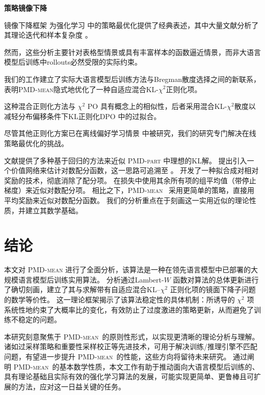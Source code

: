 \documentclass{article}
\theoremstyle{plain}
\theoremstyle{definition}
\theoremstyle{remark}
\begin{document}
\textbf{策略镜像下降}

镜像下降框架 \citep{nemirovski1983problem} 为强化学习 \citep{geist2019theory,tomarmirror} 中的策略最优化提供了经典表述，其中大量文献分析了其理论迭代和样本复杂度 \citep{xiao2022convergence,zhan2023policy,lan2023policy,yuan2023linear,alfano2023novel,xu2024sample}。

然而，这些分析主要针对表格型情景或具有丰富样本的函数逼近情景，而非大语言模型后训练中rollouts必然受限的实际约束。

我们的工作建立了实际大语言模型后训练方法与Bregman散度选择之间的新联系，表明\textsc{PMD-mean}隐式地优化了一种自适应混合KL-$\chi^2$正则化项。

这种混合正则化方法与 $\chi^2$ PO \citep{huang2024correcting} 具有概念上的相似性，后者采用混合KL-$\chi^2$散度以减轻分布偏移条件下KL正则化DPO \citep{rafailov2023direct}中的过拟合。

尽管其他正则化方案已在离线偏好学习情景 \citep{wang2023beyond} 中被研究，我们的研究专门解决在线策略最优化的挑战。

文献提供了多种基于回归的方法来近似 \textsc{PMD-part} 中理想的KL解。  
\citet{richemond2024offline} 提出引入一个价值网络来估计对数配分函数，这一思路可追溯至 \citet{nachum2017bridging}。  
\citet{gao2024rebel} 开发了一种拟合成对相对奖励的技术，彻底消除了配分项。  
\citet{bartoldson2025trajectory} 在损失中使用其余所有项的组平均值（带停止梯度）来近似对数配分项。  
相比之下，\textsc{PMD-mean}\ \citep{team2025kimik15} 采用更简单的策略，直接用平均奖励来近似对数配分函数。  
我们的分析重点在于刻画这一实用近似的理论性质，并建立其数学基础。

\section{结论}
\label{sec:conclusion}
本文对 \textsc{PMD-mean} 进行了全面分析，该算法是一种在领先语言模型中已部署的大规模语言模型后训练实用算法。  
分析通过Lambert-$W$ 函数对算法的总体更新进行了确切刻画，建立了其与求解带有自适应混合KL--$\chi^2$ 正则化项的镜面下降子问题的数学等价性。  
这一理论框架揭示了该算法稳定性的具体机制：所诱导的 $\chi^2$ 项系统性地约束了大概率比的变化，有效防止了过度激进的策略更新，从而避免了训练不稳定的问题。

本研究刻意聚焦于 \textsc{PMD-mean}\ 的原则性形式，以实现更清晰的理论分析与理解。  
诸如过采样策略和重要性采样校正等先进技术，可用于解决训练/推理引擎不匹配问题，有望进一步提升 \textsc{PMD-mean}\ 的性能，这些方向将留待未来研究。  
通过阐明 \textsc{PMD-mean}\ 的基本数学性质，本文工作有助于推动面向大语言模型后训练的、具有理论基础且实际有效的强化学习算法的发展，可能实现更简单、更鲁棒且可扩展的方法，应对这一日益关键的任务。
\end{document}
